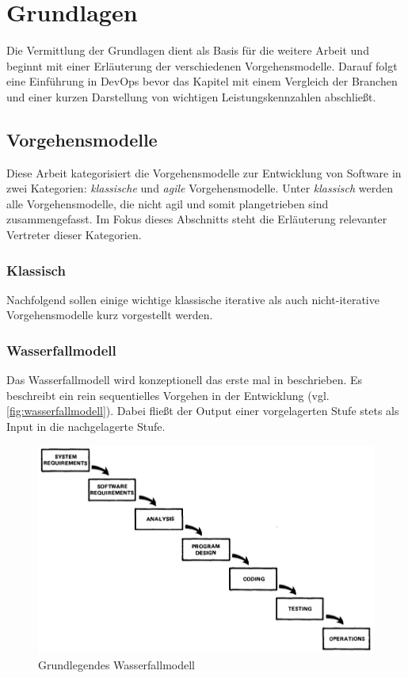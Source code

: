 \chapter{Grundlagen} %

Die Vermittlung der Grundlagen dient als Basis für die weitere Arbeit und beginnt mit  einer Erläuterung der verschiedenen Vorgehensmodelle.
Darauf folgt eine Einführung in DevOps bevor das Kapitel mit einem Vergleich der Branchen und einer kurzen Darstellung von wichtigen Leistungskennzahlen abschließt.

\section{Vorgehensmodelle} %

Diese Arbeit kategorisiert die Vorgehensmodelle zur Entwicklung von Software in zwei Kategorien: \emph{klassische} und \emph{agile} Vorgehensmodelle.
Unter \emph{klassisch} werden alle Vorgehensmodelle, die nicht agil und somit plangetrieben sind zusammengefasst.
Im Fokus dieses Abschnitts steht die Erläuterung relevanter Vertreter dieser Kategorien.

\subsection{Klassisch} %

Nachfolgend sollen einige wichtige klassische iterative als auch nicht-iterative Vorgehensmodelle kurz vorgestellt werden.

\subsection{Wasserfallmodell}

Das Wasserfallmodell wird konzeptionell das erste mal in \parencite[][]{Royce:1970aa} beschrieben.
Es beschreibt ein rein sequentielles Vorgehen in der Entwicklung (vgl. \autoref{fig:wasserfallmodell}). 
Dabei fließt der Output einer vorgelagerten Stufe stets als Input in die nachgelagerte Stufe.

\begin{figure}
  \centering
  \includegraphics[width=\textwidth]{img/wasserfallmodell.png}
  \caption{Grundlegendes Wasserfallmodell \parencite[][]{Royce:1970aa}}
  \label{fig:wasserfallmodell}
\end{figure}

